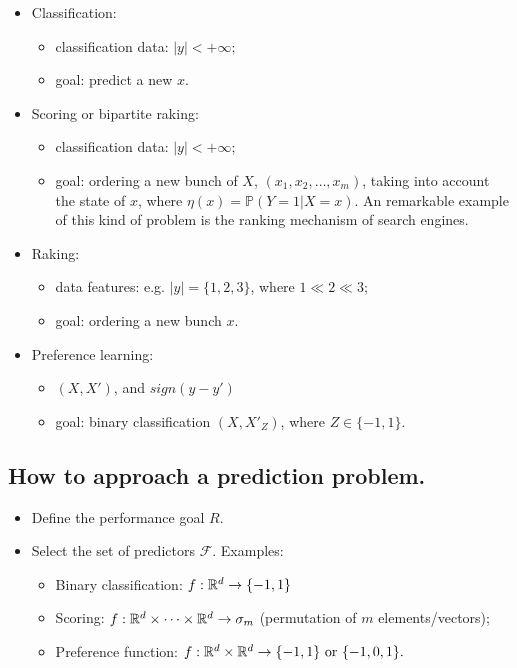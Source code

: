 			\begin{itemize}
				\item Classification: 
					\begin{itemize}
						\item classification data: $|y|<+\infty$; 
						\item goal: predict a new $x$.
					\end{itemize}
				\item Scoring or bipartite raking: 
					\begin{itemize}
						\item classification data: $|y|<+\infty$; 
						\item goal: ordering a new bunch of $X$, $(x_1,x_2,\dots,x_m)$, taking into account the state of $x$, where $\eta(x)=\mathbb{P}(Y=1|X=x)$. An remarkable example of this kind of problem is the ranking mechanism of search engines.
					\end{itemize}
				\item Raking: 
					\begin{itemize}
						\item data features: e.g. $|y|=\{1,2,3\}$, where $1 \ll 2 \ll 3$;
						\item goal: ordering a new bunch $x$.
					\end{itemize}
				\item Preference learning: 
					\begin{itemize}
							\item $(X,X')$, and $sign(y-y')$
						\item goal: binary classification $(X,X'_Z)$, where $Z \in \{-1,1\}$.
					\end{itemize}
			\end{itemize}

		\subsection{How to approach a prediction problem.}
			\begin{itemize}
				\item Define the performance goal $R$. 
				\item Select the set of predictors $\mathcal{F}$. Examples: 
					\begin{itemize}
							\item Binary classification: $\mathnormal{f}:\mathbb{R}^d\rightarrow\{-1,1\}$
							\item Scoring: $\mathnormal{f}:\mathbb{R}^d \times \dots \times \mathbb{R}^d \rightarrow {\sigma}_m $ (permutation  of $m$ elements/vectors);
							\item Preference function: $\mathnormal{f}:\mathbb{R}^d \times \mathbb{R}^d \rightarrow \{-1,1\} \mbox{ or } \{-1,0,1\}.$
					\end{itemize}
			\end{itemize}

